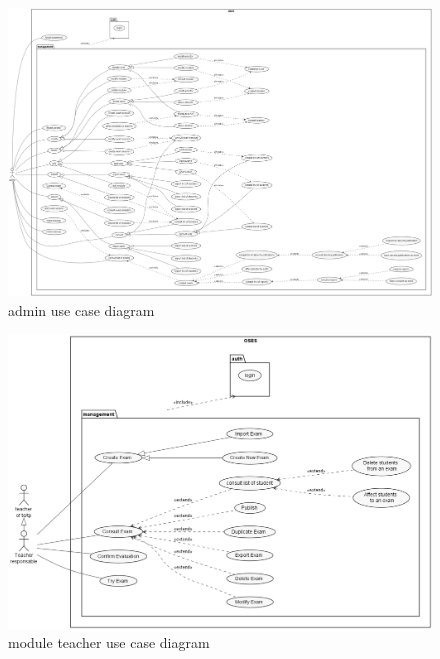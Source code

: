 \documentclass[a4paper,12p]{article}
\begin{document}

    \begin{figure}[h]
        \centering
        \includegraphics[width=\textwidth]{admin_UCD}
        \caption{admin use case diagram}
    \end{figure}

    \begin{figure}[h]
        \centering
        \includegraphics[width=\textwidth]{Module_Teacher}
        \caption{module teacher use case diagram}
    \end{figure}
\end{document}
